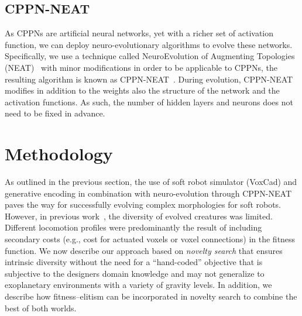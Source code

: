\documentclass{sig-alternate}
\begin{document}

\subsection{CPPN-NEAT}
As CPPNs are artificial neural networks, yet with a richer set of activation function, we can deploy neuro-evolutionary algorithms to evolve these networks. Specifically, we use a technique called NeuroEvolution of Augmenting Topologies (NEAT)~\cite{stanley2002evolving} with minor modifications in order to be applicable to CPPNs, the resulting algorithm is known as CPPN-NEAT~\cite{stanley2007compositional}. During evolution, CPPN-NEAT modifies in addition to the weights also the structure of the network and the activation functions. As such, the number of hidden layers and neurons does not need to be fixed in advance.

\section{Methodology}
As outlined in the previous section, the use of soft robot simulator (VoxCad) and generative encoding in combination with neuro-evolution through CPPN-NEAT paves the way for successfully evolving complex morphologies for soft robots. However, in previous work~\cite{cheney2013unshackling}, the diversity of evolved creatures was limited. Different locomotion profiles were predominantly the result of including secondary costs (e.g., cost for actuated voxels or voxel connections) in the fitness function. We now describe our approach based on \textit{novelty search} that ensures intrinsic diversity without the need for a ``hand-coded'' objective that is subjective to the designers domain knowledge and may not generalize to exoplanetary environments with a variety of gravity levels. In addition, we describe how fitness--elitism can be incorporated in novelty search to combine the best of both worlds.
\end{document}
